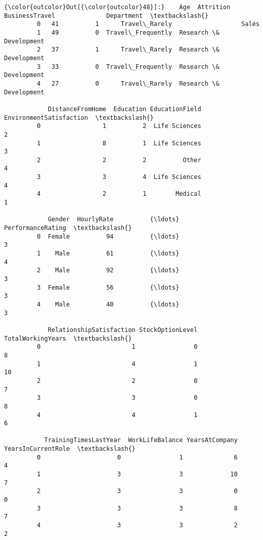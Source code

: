 \documentclass[11pt]{article}
\begin{document}
\begin{Verbatim}[commandchars=\\\{\}]
{\color{outcolor}Out[{\color{outcolor}48}]:}    Age  Attrition     BusinessTravel              Department  \textbackslash{}
         0   41          1      Travel\_Rarely                   Sales   
         1   49          0  Travel\_Frequently  Research \& Development   
         2   37          1      Travel\_Rarely  Research \& Development   
         3   33          0  Travel\_Frequently  Research \& Development   
         4   27          0      Travel\_Rarely  Research \& Development   
         
            DistanceFromHome  Education EducationField  EnvironmentSatisfaction  \textbackslash{}
         0                 1          2  Life Sciences                        2   
         1                 8          1  Life Sciences                        3   
         2                 2          2          Other                        4   
         3                 3          4  Life Sciences                        4   
         4                 2          1        Medical                        1   
         
            Gender  HourlyRate          {\ldots}           PerformanceRating  \textbackslash{}
         0  Female          94          {\ldots}                           3   
         1    Male          61          {\ldots}                           4   
         2    Male          92          {\ldots}                           3   
         3  Female          56          {\ldots}                           3   
         4    Male          40          {\ldots}                           3   
         
            RelationshipSatisfaction StockOptionLevel  TotalWorkingYears  \textbackslash{}
         0                         1                0                  8   
         1                         4                1                 10   
         2                         2                0                  7   
         3                         3                0                  8   
         4                         4                1                  6   
         
           TrainingTimesLastYear  WorkLifeBalance YearsAtCompany  YearsInCurrentRole  \textbackslash{}
         0                     0                1              6                   4   
         1                     3                3             10                   7   
         2                     3                3              0                   0   
         3                     3                3              8                   7   
         4                     3                3              2                   2   
         

\end{Verbatim}
\end{document}

